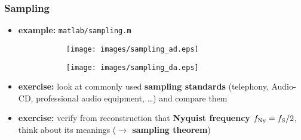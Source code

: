 \begin{frame}
	\frametitle{Sampling}
	\begin{itemize}
		\item \textbf{example:} \texttt{matlab/sampling.m}
			\begin{figure}
				\centering
				\begin{subfigure}[t]{0.48\linewidth}
					\texttt{[image: images/sampling\_ad.eps]}
				\end{subfigure}
				\hspace{0.01\linewidth}
				\begin{subfigure}[t]{0.48\linewidth}
					\texttt{[image: images/sampling\_da.eps]}
				\end{subfigure}
			\end{figure}
		\item \textbf{exercise:} look at commonly used \textbf{sampling standards} (telephony, Audio-CD, professional audio equipment, \ldots) and compare them
		\item \textbf{exercise:} verify from reconstruction that \textbf{Nyquist frequency} $f_{\textrm{Ny}}=f_{\textrm S}/2$, think about its meanings (\textbf{$\rightarrow$ sampling theorem})
	\end{itemize}
\end{frame}

